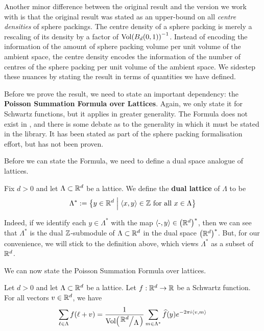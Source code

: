Another minor difference between the original result and the version we work with is that the original result was stated as an upper-bound on all \textit{centre densities} of sphere packings. The centre density of a sphere packing is merely a rescaling of its density by a factor of $\operatorname{Vol}\!\left( B_d\!\left( 0, 1 \right) \right)^{-1}$. Instead of encoding the information of the amount of sphere packing volume per unit volume of the ambient space, the centre density encodes the information of the number of centres of the sphere packing per unit volume of the ambient space. We sidestep these nuances by stating the result in terms of quantities we have defined.

Before we prove the result, we need to state an important dependency: the \textbf{Poisson Summation Formula over Lattices}. Again, we only state it for Schwartz functions, but it applies in greater generality. The Formula does not exist in \mathlib, and there is some debate as to the generality in which it must be stated in the library. It has been stated as part of the sphere packing formalisation effort, but has not been proven.

Before we can state the Formula, we need to define a dual space analogue of lattices.

\begin{boxdefinition}
    Fix $d > 0$ and let $\Lambda \subset \mathbb{R}^d$ be a lattice. We define the \textbf{dual lattice} of $\Lambda$ to be
    \begin{align*}
        \Lambda^* := \left\{ y \in \mathbb{R}^d \; \middle\vert \; \left\langle x, y \right\rangle \in \mathbb{Z} \text{ for all } x \in \Lambda \right\}
    \end{align*}
\end{boxdefinition}

Indeed, if we identify each $y \in \Lambda^*$ with the map $\left\langle \text{-}, y \right\rangle \in \left( \mathbb{R}^d \right)^*$, then we can see that $\Lambda^*$ is the dual $\mathbb{Z}$-submodule of $\Lambda \subset \mathbb{R}^d$ in the dual space $\left( \mathbb{R}^{d} \right)^*$. But, for our convenience, we will stick to the definition above, which views $\Lambda^*$ as a subset of $\mathbb{R}^d$.

We can now state the Poisson Summation Formula over lattices.

\begin{boxtheorem}
    Let $d > 0$ and let $\Lambda \subset \mathbb{R}^d$ be a lattice. Let $f : \mathbb{R}^d \to \mathbb{R}$ be a Schwartz function. For all vectors $v \in \mathbb{R}^d$, we have
    \begin{align*}
        \sum_{\ell \in \Lambda} \fof{\ell + v} = \frac{1}{\Volof{\quotient{\R^d}{\Lambda}}} \sum_{m \in \Lambda^*} \hat{f}(y) e^{-2\pi i \cycl{v, m}}
    \end{align*}
\end{boxtheorem}

